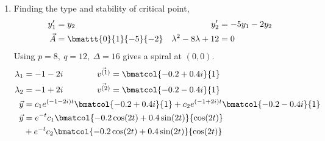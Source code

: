 \begin{enumerate}
    \item Finding the type and stability of critical point,
          \begin{align}
              y_1'                        & = y_2                   &
              y_2'                        & = -5y_1 - 2y_2            \\
              \vec{A}                     & = \bmattt{0}{1}{-5}{-2} &
              \lambda^{2} - 8\lambda + 12 & = 0
          \end{align}
          Using $ p = 8,\ q = 12,\ \Delta = 16 $ gives a spiral at
          $ (0, 0) $.
          \begin{align}
              \lambda_1 & = -1 - 2i                                \qquad\qquad
              \vec{v^{(1)}}  = \bmatcol{-0.2+0.4i}{1}                           \\
              \lambda_2 & = -1 + 2i                                \qquad\qquad
              \vec{v^{(2)}}  = \bmatcol{-0.2-0.4i}{1}                           \\
              \vec{y}   & = c_1 e^{(-1-2i)t}\bmatcol{-0.2+0.4i}{1}
              + c_2 e^{(-1+2i)t} \bmatcol{-0.2-0.4i}{1}                         \\
              \vec{y}   & = e^{-t}c_1 \bmatcol{-0.2\cos(2t)
              + 0.4\sin(2t)}{\cos(2t)}  \nonumber                               \\
                        & + e^{-t}c_2 \bmatcol{-0.2\cos(2t)
                  + 0.4\sin(2t)}{\cos(2t)}
          \end{align}
          \begin{figure}[H]
              \centering
\end{figure}
\end{enumerate}
